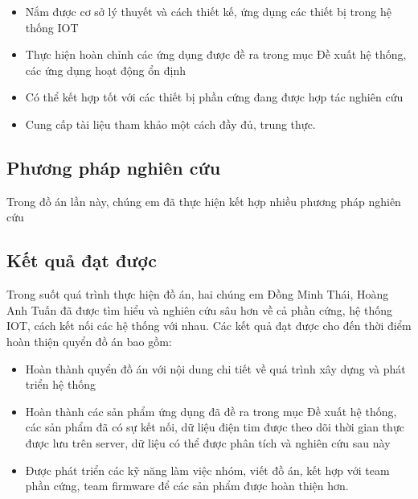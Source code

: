 \begin{adjustwidth}{1.5em}{}
  \begin{itemize}
      \item Nắm được cơ sở lý thuyết và cách thiết kế, ứng dụng các thiết bị trong hệ thống IOT

  
      \item Thực hiện hoàn chỉnh các ứng dụng được đề ra trong mục Đề xuất hệ thống, các ứng dụng hoạt động ổn định

  
      \item Có thể kết hợp tốt với các thiết bị phần cứng đang được hợp tác nghiên cứu

  
      \item Cung cấp tài liệu tham khảo một cách đầy đủ, trung thực.

  \end{itemize}
  \end{adjustwidth}





\subsection*{Phương pháp nghiên cứu}
Trong đồ án lần này, chúng em đã thực hiện kết hợp nhiều phương pháp nghiên cứu

\subsection*{Kết quả đạt được}

Trong suốt quá trình thực hiện đồ án, hai chúng em Đồng Minh Thái, Hoàng Anh Tuấn đã được tìm hiểu và nghiên cứu sâu hơn về cả phần cứng,
hệ thống IOT, cách kết nối các hệ thống với nhau. Các kết quả đạt được cho đến thời điểm hoàn thiện quyển đồ án bao gồm:

\begin{adjustwidth}{1.5em}{}
  \begin{itemize}
      \item Hoàn thành quyển đồ án với nội dung chi tiết về quá trình xây dựng và phát triển hệ thống

  
      \item Hoàn thành các sản phẩm ứng dụng đã đề ra trong mục Đề xuất hệ thống, các sản phẩm đã có sự kết nối, dữ liệu điện tim được theo dõi
      thời gian thực được lưu trên server, dữ liệu có thể được phân tích và nghiên cứu sau này
  
      \item Được phát triển các kỹ năng làm việc nhóm, viết đồ án, kết hợp với team phần cứng, team firmware để các sản phẩm được hoàn thiện hơn.

    \end{itemize}
  \end{adjustwidth}




